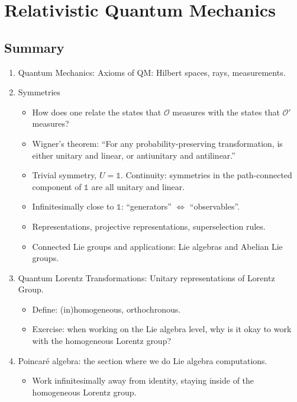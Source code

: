 \documentclass[10pt]{article}
\newcommand{\iden}{\mathds{1}}
\newcommand{\ms}{\mathscr}
\theoremstyle{plain}
\theoremstyle{definition}
\theoremstyle{remark}
\begin{document}
\date{}
\title{}
\author{}


\section{ Relativistic Quantum Mechanics }
%

\subsection{Summary}
\begin{enumerate}
    \item Quantum Mechanics: Axioms of QM: Hilbert spaces, rays, measurements.
    \item Symmetries
        \begin{itemize}
            \item How does one relate the states that $\ms O$ measures with the states that $\ms O'$ measures?
            \item Wigner's theorem: ``For any probability-preserving transformation, is either unitary and linear, or antiunitary and antilinear.'' 
            \item Trivial symmetry, $U=\iden$. Continuity: symmetries in the path-connected component of $\iden$ are all unitary and linear. 
            \item Infinitesimally close to $\iden$: ``generators'' $\iff$ ``observables''.
            \item Representations, projective representations, superselection rules.
            \item Connected Lie groups and applications: Lie algebras and Abelian Lie groups.
        \end{itemize}
    \item Quantum Lorentz Transformations: Unitary representations of Lorentz Group.
        \begin{itemize}
            \item Define: (in)homogeneous, orthochronous. 
            \item Exercise: when working on the Lie algebra level, why is it okay to work with the homogeneous Lorentz group?
        \end{itemize}
    \item Poincar\'e algebra: the section where we do Lie algebra computations.
        \begin{itemize}
            \item Work infinitesimally away from identity, staying inside of the homogeneous Lorentz group.

\end{itemize}
\end{enumerate}
\end{document}
